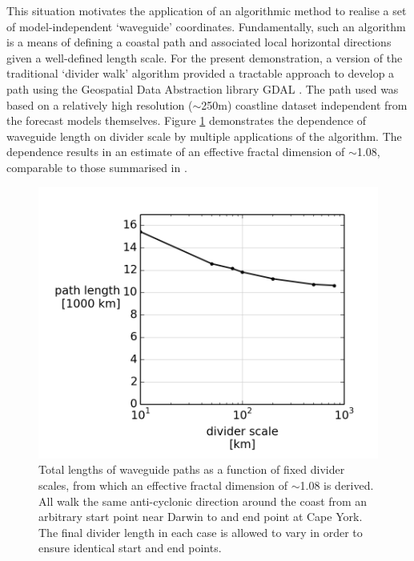 This situation motivates the application of an algorithmic method to realise a set of model-independent `waveguide' coordinates.
Fundamentally, such an algorithm is a means of defining a coastal path and associated local horizontal directions given a well-defined length scale.
For the present demonstration, a version of the traditional `divider walk' \citep{Xu:1993} algorithm provided a tractable approach to develop a path using the Geospatial Data Abstraction library GDAL \citep{gdal}. 
The path used was based on a relatively high resolution ($\sim$250m) coastline dataset independent from the forecast models themselves.
Figure \ref{fig:mandelbrot_lengths} demonstrates the dependence of waveguide length on divider scale by multiple applications of the algorithm.  The dependence results in an estimate of an effective fractal dimension of $\sim$1.08, comparable to those summarised in \cite{MA2016}.
\begin{figure}[H]\centering
    \noindent\includegraphics[width=\myfigwidthHalf]{figures/plots/mandelbrot_lengths.png}
    \caption[Waveguide length dependence on scale]{Total lengths of waveguide paths as a function of fixed divider scales, from which an effective fractal dimension of $\sim$1.08 is derived.  
All walk the same anti-cyclonic direction around the coast from an arbitrary start point near Darwin to and end point at Cape York. 
The final divider length in each case is allowed to vary in order to ensure identical start and end points.}
    \label{fig:mandelbrot_lengths}
\end{figure}  
